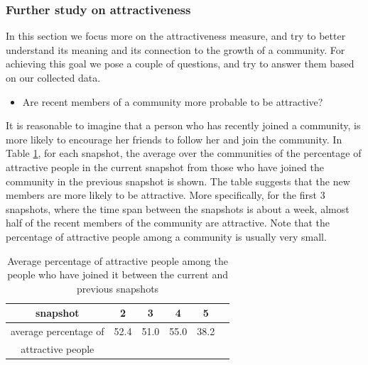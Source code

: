 \subsubsection{Further study on attractiveness}

In this section we focus more on the attractiveness measure, and try to better understand its meaning and its connection to the growth of a community. For achieving this goal we pose a couple of questions, and try to answer them based on our collected data.

\begin{itemize}
\item Are recent members of a community more probable to be attractive?
\end{itemize}

It is reasonable to imagine that a person who has recently joined a community, is more likely to encourage her friends to follow her and join the community.  In Table \ref{table:rec}, for each snapshot, the average over the communities of the percentage of  attractive people in the current snapshot from those who have joined the community in the previous snapshot is shown. The table suggests that the new members are more likely to be attractive. More specifically, for the first 3 snapshots, where the time span between the snapshots is about a week, almost half of the recent members of the community are attractive. Note that the percentage of attractive people among a community is usually very small.

\begin{table}[htdp]
\caption{Average percentage of attractive people among the people who have  joined it between the current and previous snapshots}
\begin{center}
\begin{tabular}{|c|c|c|c|c|c}
\hline
snapshot & 2 & 3 & 4 & 5 \\ \hline
average percentage of   & 52.4 & 51.0 & 55.0 & 38.2 \\
attractive people  &  &  & &  \\ \hline
\end{tabular}
\end{center}
\label{table:rec}
\end{table}


